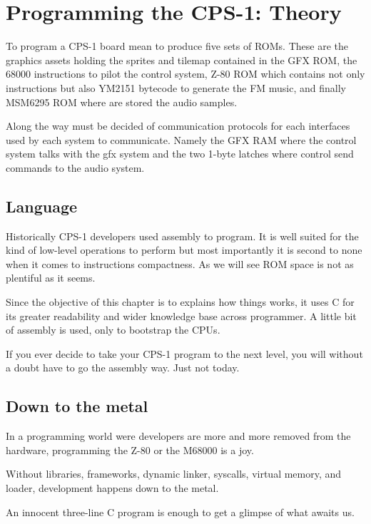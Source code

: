 \chapter{Programming the CPS-1: Theory}

To program a CPS-1 board mean to produce five sets of ROMs. These are the graphics assets holding the sprites and tilemap contained in the GFX ROM, the 68000 instructions to pilot the control system, Z-80 ROM which contains not only instructions but also YM2151 bytecode to generate the FM music, and finally MSM6295 ROM where are stored the audio samples.


Along the way must be decided of communication protocols for each interfaces used by each system to communicate. Namely the GFX RAM where the control system talks with the gfx system and the two 1-byte latches where control send commands to the audio system.


\section{Language}
Historically CPS-1 developers used assembly to program. It is well suited for the kind of low-level operations to perform but most importantly it is second to none when it comes to instructions compactness. As we will see ROM space is not as plentiful as it seems.

Since the objective of this chapter is to explains how things works, it uses C for its greater readability and wider knowledge base across programmer. A little bit of assembly is used, only to bootstrap the CPUs.

If you ever decide to take your CPS-1 program to the next level, you will without a doubt have to go the assembly way. Just not today.

\section{Down to the metal}
In a programming world were developers are more and more removed from the hardware, programming the Z-80 or the M68000 is a joy.

Without libraries, frameworks, dynamic linker, syscalls, virtual memory, and loader, development happens down to the metal.

An innocent three-line C program is enough to get a glimpse of what awaits us.



